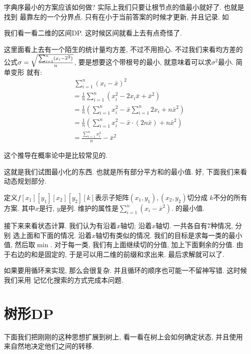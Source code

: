 字典序最小的方案应该如何做? 实际上我们只要让根节点的值最小就好了. 也就是找到
最靠左的一个分界点. 只有在小于当前答案的时候才更新, 并且记录. 如

我们看一看二维的区间DP. 这时候区间就看上去有点奇怪了. 

 这里面看上去有一个陌生的统计量均方差, 不过不用担心. 
不过我们来看均方差的公式$\sigma = \sqrt{\sum_{i=1}^n(x_i-\overline{x}^2)
\over n}$, 要是想要这个带根号的最小, 就意味着可以求$\sigma^2$最小. 简单变形
就有: 
$$
    \begin{aligned}
        &~{\sum_{i=1}^{n} (x_i-\bar x)^2} \\
        &= \frac1n\sum_{i=1}^{n} (x_i^2-2x_i\bar x+\bar x^2) \\
        &= \frac1n \left(\sum_{i=1}^{n} x_i^2 - \bar x \sum_{i=1}^{n}2x_i + n\bar x^2\right)\\
        &= \frac1n \left(\sum_{i=1}^{n} x_i^2 - \bar x \cdot (2n\bar x) + n\bar x^2\right)\\
        &= \frac{\sum_{i=1}^n x_i^2}{n} - \bar x^2
    \end{aligned}
$$

\begin{remark}
    这个推导在概率论中是比较常见的. 
\end{remark}

这就是我们试图最小化的东西. 也就是所有部分平方和的最小值. 好, 下面我们来看动态规划部分.

定义$f[x_1][y_1][x_2][y_2][k]$表示子矩阵$(x_1, y_1), (x_2, y_2)$切分成
$k$不分的所有方案. 其中$x$是行, $y$是列. 维护的属性是$\sum_{i=1}^n(x_i-\overline{x}^2)$.
的最小值. 

接下来来看状态计算. 我们认为有沿着$x$轴切; 沿着$x$轴切. 一共各自有7种情况, 分别
选上面和下面的情况. 沿着$x$轴切有类似的情况. 
我们的目标是求每一类的最小值, 然后取$\min$. 对于每一类, 我们有上面继续切的分值, 
加上下面剩余的分值. 由于右边的和是固定的, 于是可以用二维的前缀和求出来. 最后求解就可以了. 

如果要用循环来实现, 那么会很复杂. 并且循环的顺序也可能一不留神写错. 这时候我们采用
记忆化搜索的方式完成本问题. 

\section{树形DP}

下面我们把刚刚的这种思想扩展到树上, 看一看在树上会如何确定状态, 并且使用
来自然地决定他们之间的转移. 

